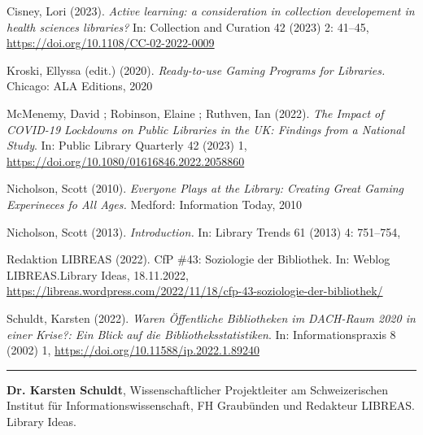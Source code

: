 \documentclass[a4paper,
fontsize=11pt,
oneside,
numbers=noperiodatend,
parskip=half-,
bibliography=totoc,
final
]{scrartcl}
\begin{document}
Cisney, Lori (2023). \emph{Active learning: a consideration in
collection developement in health sciences libraries?} In: Collection
and Curation 42 (2023) 2: 41--45,
\url{https://doi.org/10.1108/CC-02-2022-0009}

Kroski, Ellyssa (edit.) (2020). \emph{Ready-to-use Gaming Programs for
Libraries.} Chicago: ALA Editions, 2020

McMenemy, David ; Robinson, Elaine ; Ruthven, Ian (2022). \emph{The
Impact of COVID-19 Lockdowns on Public Libraries in the UK: Findings
from a National Study}. In: Public Library Quarterly 42 (2023) 1,
\url{https://doi.org/10.1080/01616846.2022.2058860}

Nicholson, Scott (2010). \emph{Everyone Plays at the Library: Creating
Great Gaming Experineces fo All Ages.} Medford: Information Today, 2010

Nicholson, Scott (2013). \emph{Introduction.} In: Library Trends 61
(2013) 4: 751--754,

Redaktion LIBREAS (2022). CfP \#43: Soziologie der Bibliothek. In:
Weblog LIBREAS.Library Ideas, 18.11.2022,
\url{https://libreas.wordpress.com/2022/11/18/cfp-43-soziologie-der-bibliothek/}

Schuldt, Karsten (2022). \emph{Waren Öffentliche Bibliotheken im
DACH-Raum 2020 in einer Krise?: Ein Blick auf die
Bibliotheksstatistiken}. In: Informationspraxis 8 (2002) 1,
\url{https://doi.org/10.11588/ip.2022.1.89240}

\begin{center}\rule{0.5\linewidth}{0.5pt}\end{center}

\textbf{Dr. Karsten Schuldt}, Wissenschaftlicher Projektleiter am Schweizerischen Institut für Informationswissenschaft, FH Graubünden und Redakteur LIBREAS. Library Ideas.
\end{document}
